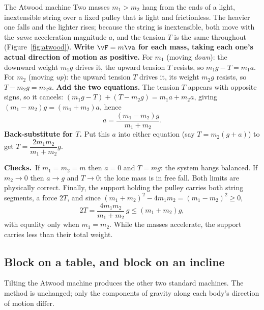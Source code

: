 \begin{figure}[htbp]
\centering
{}
\end{figure}

\begin{derivbox}{The Atwood machine}
Two masses $m_1>m_2$ hang from the ends of a light, inextensible string over a fixed pulley that is
light and frictionless. The heavier one falls and the
lighter rises; because the string is inextensible, both move with the \emph{same} acceleration magnitude
$a$, and the tension $T$ is the same throughout (Figure~\ref{fig:atwood}).
 \textbf{Write $\vF=m\va$ for each mass, taking each one's actual direction of motion as
positive.} For $m_1$ (moving \emph{down}): the downward weight $m_1g$ drives it, the upward tension $T$
resists, so $m_1g-T=m_1a$. For $m_2$ (moving \emph{up}): the upward tension $T$ drives it, its weight
$m_2g$ resists, so $T-m_2g=m_2a$.
 \textbf{Add the two equations.} The tension $T$ appears with opposite signs, so it cancels:
$(m_1g-T)+(T-m_2g)=m_1a+m_2a$, giving $(m_1-m_2)g=(m_1+m_2)a$, hence
\[
a=\frac{(m_1-m_2)g}{m_1+m_2}.
\]
 \textbf{Back-substitute for $T$.} Put this $a$ into either equation (say $T=m_2(g+a)$) to get
$T=\dfrac{2m_1 m_2}{m_1+m_2}g$.
\par\medskip\noindent\textbf{Checks.}\ If $m_1=m_2=m$ then $a=0$ and $T=mg$: the system hangs
balanced. If $m_2\to0$ then $a\to g$ and $T\to0$: the lone mass is in free fall. Both limits are
physically correct. Finally, the support holding the pulley carries both string segments, a force $2T$,
and since $(m_1+m_2)^2-4m_1m_2=(m_1-m_2)^2\ge0$,
\[
2T=\frac{4m_1m_2}{m_1+m_2}\,g\le(m_1+m_2)g,
\]
with equality only when $m_1=m_2$. While the masses accelerate, the support carries less than their
total weight.
\end{derivbox}

\subsection{Block on a table, and block on an incline}

Tilting the Atwood machine produces the other two standard machines. The method is unchanged; only the
components of gravity along each body's direction of motion differ.

